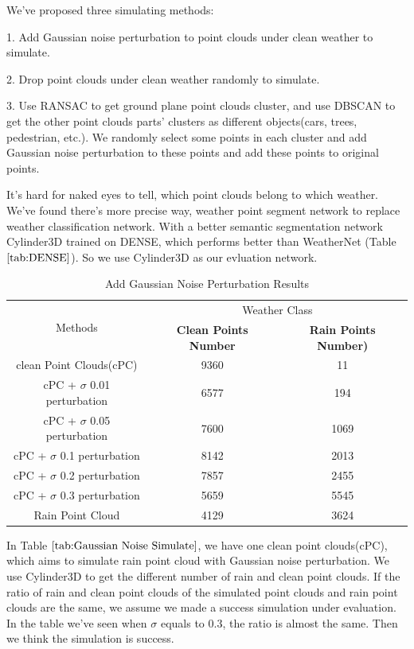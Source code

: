 We've proposed three simulating methods:

1. Add Gaussian noise perturbation to point clouds under clean weather to simulate.

2. Drop point clouds under clean weather randomly to simulate.

3. Use RANSAC\cite{fischler_random_1981} to get ground plane point clouds cluster, and use DBSCAN\cite{rehman_dbscan_2014} to get the other point clouds parts' clusters as different objects(cars, trees, pedestrian, etc.). We randomly select some points in each cluster and add Gaussian noise perturbation to these points and add these points to original points.

It's hard for naked eyes to tell, which point clouds belong to which weather. We've found there's more precise way, weather point segment network to replace weather classification network. With a better semantic segmentation network Cylinder3D\cite{zhu_cylindrical_2020} trained on DENSE\cite{DENSE}, which performs better than WeatherNet (Table \(\ref{tab:DENSE}\)). So we use Cylinder3D as our evluation network.

 \begin{table}[h!]
  \begin{center}

    \begin{tabular}{|c|c|c|} %
      \hline
      \multirow{2}{*}{Methods} & \multicolumn{2}{c|}{Weather Class}\\
    \cline{2-3}
       &\textbf{Clean Points Number} & \textbf{Rain Points Number)}\\
      \hline
      clean Point Clouds(cPC) & 9360 & 11\\
      \hline
      cPC + \(\sigma\) 0.01 perturbation & 6577 & 194\\
      \hline
      cPC + \(\sigma\) 0.05 perturbation & 7600 & 1069\\
      \hline
      cPC + \(\sigma\) 0.1 perturbation & 8142 & 2013\\
      \hline
      cPC + \(\sigma\) 0.2 perturbation & 7857 & 2455\\
      \hline
      cPC + \(\sigma\) 0.3 perturbation & 5659 & 5545\\
      \hline
      Rain Point Cloud & 4129 & 3624\\
    \hline
    \end{tabular}
    \caption{Add Gaussian Noise Perturbation Results}
  \end{center}
    \label{tab:Gaussian Noise Simulate}
\end{table}
In Table \(\ref{tab:Gaussian Noise Simulate}\), we have one clean point clouds(cPC), which aims to simulate rain point cloud with Gaussian noise perturbation. We use Cylinder3D to get the different number of rain and clean point clouds. If the ratio of rain and clean point clouds of the simulated point clouds and rain point clouds are the same, we assume we made a success simulation under evaluation. In the table we've seen when \(\sigma\) equals to 0.3, the ratio is almost the same. Then we think the simulation is success.